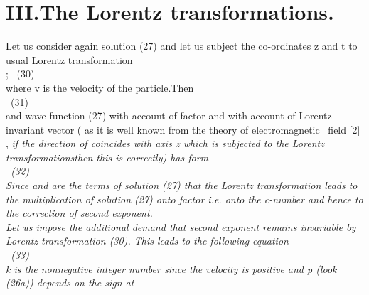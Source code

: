 \documentclass[a4paper,12pt] {article}
\begin{document}
{\section *{III.The Lorentz transformations.}
 Let us consider again solution (27) and let us subject the co-ordinates z and t to  usual Lorentz
transformation \\ \coordHE{} ;
 \coordHE{}  \ (30)
\\where v is the velocity of the particle.Then
\\\coordHE{} \ (31) \\and wave function (27) with account of factor
 \coordHE{} and with account of  Lorentz -invariant vector  \coordHE{}
\rm ( as it is well known from the theory of electromagnetic \ field [2] , \it  if the direction of  \coordHE{}
 \it coincides with axis \rm z \it which is subjected to the Lorentz transformations\rm then this is
correctly)  has form
\\\coordHE{}\ (32)\\
Since \coordHE{}
and \coordHE{} are the terms of solution
(27) that the Lorentz transformation leads to the multiplication of solution (27) onto factor
 \coordHE{} i.e. \it onto the c-number \rm  and hence to the correction of second
exponent.\\ Let us impose the additional demand that \it  second exponent remains invariable by Lorentz
 transformation \rm  (30). This leads to the following equation
\\\coordHE{} \ (33)\\ k is the nonnegative
integer number since \it the velocity is positive \rm and p (look (26a)) depends on the sign at
}
\end{document}
